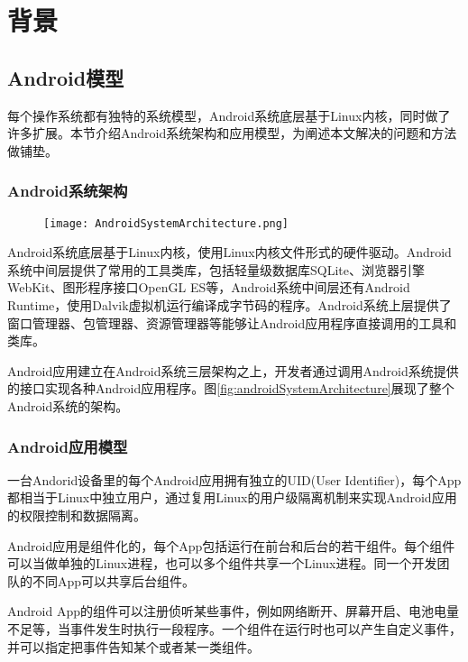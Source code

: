
\chapter{背景}
\label{chap:background}

\section{Android模型}
\label{sec:androidModel}

每个操作系统都有独特的系统模型，Android系统底层基于Linux内核，同时做了许多扩展。本节介绍Android系统架构和应用模型，为阐述本文解决的问题和方法做铺垫。

\subsection{Android系统架构}

\begin{figure}[!htp]
	\centering
	\texttt{[image: AndroidSystemArchitecture.png]}
\end{figure}

Android系统底层基于Linux内核，使用Linux内核文件形式的硬件驱动。Android系统中间层提供了常用的工具类库，包括轻量级数据库SQLite、浏览器引擎WebKit、图形程序接口OpenGL ES等，Android系统中间层还有Android Runtime，使用Dalvik虚拟机运行编译成字节码的程序。Android系统上层提供了窗口管理器、包管理器、资源管理器等能够让Android应用程序直接调用的工具和类库。

Android应用建立在Android系统三层架构之上，开发者通过调用Android系统提供的接口实现各种Android应用程序。图\ref{fig:androidSystemArchitecture}展现了整个Android系统的架构。

\subsection{Android应用模型}

一台Andorid设备里的每个Android应用拥有独立的UID(User Identifier)，每个App都相当于Linux中独立用户，通过复用Linux的用户级隔离机制来实现Android应用的权限控制和数据隔离。

Android应用是组件化的，每个App包括运行在前台和后台的若干组件。每个组件可以当做单独的Linux进程，也可以多个组件共享一个Linux进程。同一个开发团队的不同App可以共享后台组件。

Android App的组件可以注册侦听某些事件，例如网络断开、屏幕开启、电池电量不足等，当事件发生时执行一段程序。一个组件在运行时也可以产生自定义事件，并可以指定把事件告知某个或者某一类组件。

